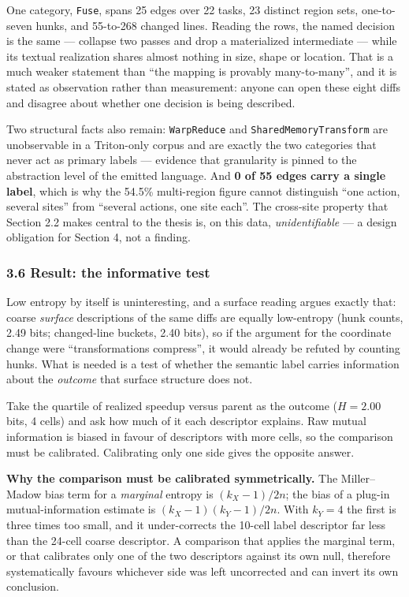 \documentclass[
  11pt,
]{article}
\begin{document}
One category, \texttt{Fuse}, spans 25 edges over 22 tasks, 23 distinct region sets, one-to-seven hunks, and 55-to-268 changed lines. Reading the rows, the named decision is the same --- collapse two passes and drop a materialized intermediate --- while its textual realization shares almost nothing in size, shape or location. That is a much weaker statement than ``the mapping is provably many-to-many'', and it is stated as observation rather than measurement: anyone can open these eight diffs and disagree about whether one decision is being described.

Two structural facts also remain: \texttt{WarpReduce} and \texttt{SharedMemoryTransform} are unobservable in a Triton-only corpus and are exactly the two categories that never act as primary labels --- evidence that granularity is pinned to the abstraction level of the emitted language. And \textbf{0 of 55 edges carry a single label}, which is why the 54.5\% multi-region figure cannot distinguish ``one action, several sites'' from ``several actions, one site each''. The cross-site property that Section 2.2 makes central to the thesis is, on this data, \emph{unidentifiable} --- a design obligation for Section 4, not a finding.

\hypertarget{result-the-informative-test}{%
\subsubsection{3.6 Result: the informative test}\label{result-the-informative-test}}

Low entropy by itself is uninteresting, and a surface reading argues exactly that: coarse \emph{surface} descriptions of the same diffs are equally low-entropy (hunk counts, 2.49 bits; changed-line buckets, 2.40 bits), so if the argument for the coordinate change were ``transformations compress'', it would already be refuted by counting hunks. What is needed is a test of whether the semantic label carries information about the \emph{outcome} that surface structure does not.

Take the quartile of realized speedup versus parent as the outcome (\(H = 2.00\) bits, 4 cells) and ask how much of it each descriptor explains. Raw mutual information is biased in favour of descriptors with more cells, so the comparison must be calibrated. Calibrating only one side gives the opposite answer.

\textbf{Why the comparison must be calibrated symmetrically.} The Miller--Madow bias term for a \emph{marginal} entropy is \((k_X-1)/2n\); the bias of a plug-in mutual-information estimate is \((k_X-1)(k_Y-1)/2n\). With \(k_Y = 4\) the first is three times too small, and it under-corrects the 10-cell label descriptor far less than the 24-cell coarse descriptor. A comparison that applies the marginal term, or that calibrates only one of the two descriptors against its own null, therefore systematically favours whichever side was left uncorrected and can invert its own conclusion.
\end{document}
